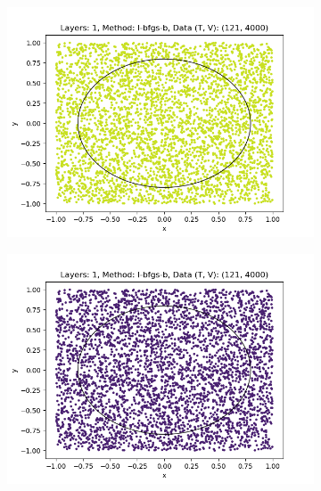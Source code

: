 \begin{figure}[h]
    \centering
    \begin{subfigure}[b]{0.45\textwidth}
        \centering
        \includegraphics[width=\textwidth]{sections/chapters/Quantum-Machine-Learning/Images/Data-Re-Uploading/Layer1-A.png}
    \end{subfigure}
    \begin{subfigure}[b]{0.45\textwidth}
        \centering
        \includegraphics[width=\textwidth]{sections/chapters/Quantum-Machine-Learning/Images/Data-Re-Uploading/Layer1-B.png}
    \end{subfigure}
    \begin{subfigure}[b]{0.45\textwidth}
        \centering

\end{subfigure}
\end{figure}
